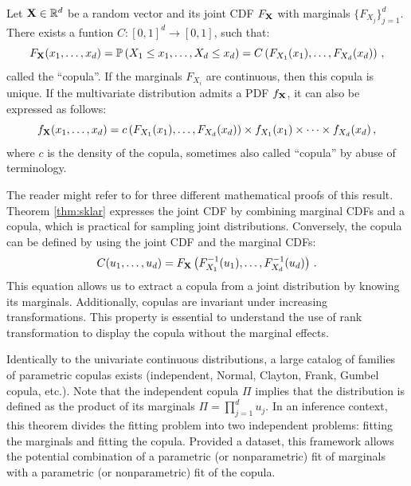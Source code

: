 \begin{theorem}
    Let $\mathbf{X} \in \mathbb{R}^d$ be a random vector and its joint CDF $F_{{\bf X}}$ with marginals $\{F_{X_j}\}_{j=1}^d$. There exists a funtion $C: [0, 1]^d \rightarrow [0, 1]$, such that:
    \begin{equation}
        F_{{\bf X}}(x_1, \dots, x_d) = \mathbb{P}\left(X_1\leq x_1,\dots ,X_d\leq x_d\right) = C\left(F_{X_1}(x_1), \dots, F_{X_d}(x_d)\right)\,, 
    \end{equation}
    called the ``copula''. 
    If the marginals $F_{X_i}$ are continuous, then this copula is unique. 
    If the multivariate distribution admits a PDF $f_{{\bf X}}$, it can also be expressed as follows:
    \begin{equation}
        f_{{\bf X}}(x_1, \dots, x_d) = c\left(F_{X_1}(x_1), \dots, F_{X_d}(x_d)\right) \times f_{X_1}(x_1) \times \dots \times f_{X_d}(x_d) \,,
    \end{equation}
    where $c$ is the density of the copula, sometimes also called ``copula'' by abuse of terminology. 
    \label{thm:sklar}
\end{theorem}

The reader might refer to \citet[Chap. 2]{durante_2015_copula} for three different mathematical proofs of this result. 
Theorem \ref{thm:sklar} expresses the joint CDF by combining marginal CDFs and a copula, which is practical for sampling joint distributions. 
Conversely, the copula can be defined by using the joint CDF and the marginal CDFs: 
\begin{equation}
    C(u_1, \dots, u_d) = F_{{\bf X}}\left(F^{-1}_{X_1}(u_1), \dots, F^{-1}_{X_d}(u_d)\right) \,.
\end{equation}
This equation allows us to extract a copula from a joint distribution by knowing its marginals.
Additionally, copulas are invariant under increasing transformations. 
This property is essential to understand the use of rank transformation to display the copula without the marginal effects.     

Identically to the univariate continuous distributions, a large catalog of families of parametric copulas exists (independent, Normal, Clayton, Frank, Gumbel copula, etc.). 
Note that the independent copula $\Pi$ implies that the distribution is defined as the product of its marginals $\Pi = \prod_{j=1}^d u_j$. 
In an inference context, this theorem divides the fitting problem into two independent problems: fitting the marginals and fitting the copula. 
Provided a dataset, this framework allows the potential combination of a parametric (or nonparametric) fit of marginals with a parametric (or nonparametric) fit of the copula. 

